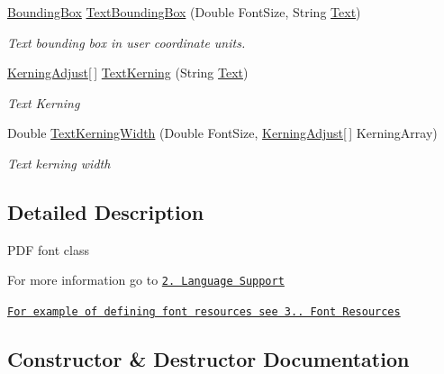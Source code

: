 \begin{DoxyCompactItemize}
\hyperlink{class_pdf_file_writer_1_1_bounding_box}{Bounding\+Box} \hyperlink{class_pdf_file_writer_1_1_pdf_font_a4d228d4a6caf31f7345d5e0937fe5c5a}{Text\+Bounding\+Box} (Double Font\+Size, String \hyperlink{namespace_pdf_file_writer_a45e52c090a4d8e1333577773ec0bac4aa9dffbf69ffba8bc38bc4e01abf4b1675}{Text})
\begin{DoxyCompactList}\small\item\em Text bounding box in user coordinate units. \end{DoxyCompactList}\item 
\hyperlink{class_pdf_file_writer_1_1_kerning_adjust}{Kerning\+Adjust}\mbox{[}$\,$\mbox{]} \hyperlink{class_pdf_file_writer_1_1_pdf_font_a2865ea464a70d1617b29e8885dbe5765}{Text\+Kerning} (String \hyperlink{namespace_pdf_file_writer_a45e52c090a4d8e1333577773ec0bac4aa9dffbf69ffba8bc38bc4e01abf4b1675}{Text})
\begin{DoxyCompactList}\small\item\em Text Kerning \end{DoxyCompactList}\item 
Double \hyperlink{class_pdf_file_writer_1_1_pdf_font_ae5e0b169b5f1b96e2bce6ca798d52a11}{Text\+Kerning\+Width} (Double Font\+Size, \hyperlink{class_pdf_file_writer_1_1_kerning_adjust}{Kerning\+Adjust}\mbox{[}$\,$\mbox{]} Kerning\+Array)
\begin{DoxyCompactList}\small\item\em Text kerning width \end{DoxyCompactList}\end{DoxyCompactItemize}


\subsection{Detailed Description}
P\+DF font class 

For more information go to \href{http://www.codeproject.com/Articles/570682/PDF-File-Writer-Csharp-Class-Library-Version#LanguageSupport}{\tt 2. Language Support} 

\href{http://www.codeproject.com/Articles/570682/PDF-File-Writer-Csharp-Class-Library-Version#FontResources}{\tt For example of defining font resources see 3.. Font Resources} 

\subsection{Constructor \& Destructor Documentation}

